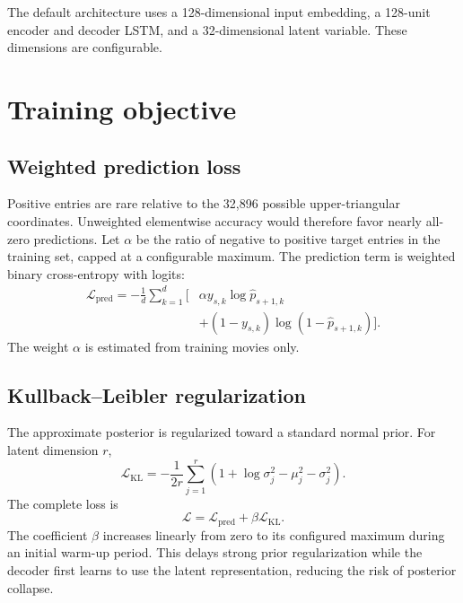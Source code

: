 \documentclass[11pt]{article}
\begin{document}
The default architecture uses a 128-dimensional input embedding, a 128-unit encoder and decoder LSTM, and a 32-dimensional latent variable. These dimensions are configurable.

\section{Training objective}

\subsection{Weighted prediction loss}

Positive entries are rare relative to the 32,896 possible upper-triangular coordinates. Unweighted elementwise accuracy would therefore favor nearly all-zero predictions. Let $\alpha$ be the ratio of negative to positive target entries in the training set, capped at a configurable maximum. The prediction term is weighted binary cross-entropy with logits:
\begin{equation}
\begin{split}
  \mathcal{L}_{\mathrm{pred}}
  =-\frac{1}{d}\sum_{k=1}^{d}\Big[
  &\alpha y_{s,k}\log \widehat{p}_{s+1,k}\\
  &+(1-y_{s,k})\log(1-\widehat{p}_{s+1,k})
  \Big].
\end{split}
\end{equation}
The weight $\alpha$ is estimated from training movies only.

\subsection{Kullback--Leibler regularization}

The approximate posterior is regularized toward a standard normal prior. For latent dimension $r$,
\begin{equation}
  \mathcal{L}_{\mathrm{KL}}
  =-\frac{1}{2r}\sum_{j=1}^{r}
  \left(1+\log\sigma_j^2-\mu_j^2-\sigma_j^2\right).
\end{equation}
The complete loss is
\begin{equation}
  \mathcal{L}
  =\mathcal{L}_{\mathrm{pred}}
  +\beta\mathcal{L}_{\mathrm{KL}}.
\end{equation}
The coefficient $\beta$ increases linearly from zero to its configured maximum during an initial warm-up period. This delays strong prior regularization while the decoder first learns to use the latent representation, reducing the risk of posterior collapse.
\end{document}

